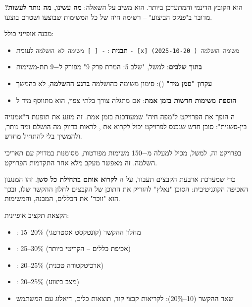 
\textbf{} הוא הקובץ הדינמי והמתעדכן ביותר. הוא משיב על השאלה: \textbf{מה עשינו, מה נותר לעשות?} מדובר ב"פנקס הביצוע" – רשימה חיה של כל המשימות שבוצעו ושטרם בוצעו.

מבנה אופייני כולל:
\begin{itemize}
  \item \textbf{תבנית }: \texttt{- [ ] משימה לא הושלמה} לעומת \texttt{- [x] משימה הושלמה (\checkmark{} 2025-10-20)}
  \item \textbf{ בתוך שלבים}: למשל, "שלב \num{5}: המרת פרק \num{9}" מפורק ל\num{-9} תת-משימות
  \item \textbf{עקרון "סמן מיד"} (): סימון משימה כהושלמה \textbf{ברגע ההשלמה}, לא בהמשך
  \item \textbf{הוספת משימות חדשות בזמן אמת}: אם מתגלה צורך בלתי צפוי, הוא מתווסף מיד ל
\end{itemize}

ה הופך את הפרויקט ל"מפה חיה" שמעודכנת בזמן אמת. זה מונע את תופעת ה"אמנזיה בין-סשנית": סוכן חדש שנכנס לפרויקט יכול לקרוא את , לראות בדיוק מה הושלם ומה נותר, ולהמשיך בלי להתחיל מחדש.

בפרויקט זה, למשל,  מכיל למעלה מ\num{-150} משימות מפורטות, מסומנות במדויק עם תאריכי השלמה. זה מאפשר מעקב מלא אחר התקדמות הפרויקט.


כדי שמערכת ארבעת הקבצים תעבוד, על ה \textbf{לקרוא אותם בתחילת כל סשן}. זהו המנגנון האכיפה הקוגניטיבית: הסוכן "נאלץ" להזריק את התוכן של הקבצים לחלון ההקשר שלו, ובכך הוא "זוכר" את הכללים, המבנה, והמשימות.

הקצאת תקציב  אופיינית:
\begin{itemize}
  \item {}: \num{15}–\num{20}\% מחלון ההקשר (קונטקסט אסטרטגי)
  \item {}: \num{25}–\num{30}\% (אכיפת כללים – הקריטי ביותר)
  \item {}: \num{20}–\num{25}\% (ארכיטקטורה טכנית)
  \item {}: \num{20}–\num{25}\% (מצב ביצוע)
  \item שאר ההקשר (\num{10}–\num{20}\%): לקריאות קבצי קוד, תוצאות כלים, דיאלוג עם המשתמש
\end{itemize}

